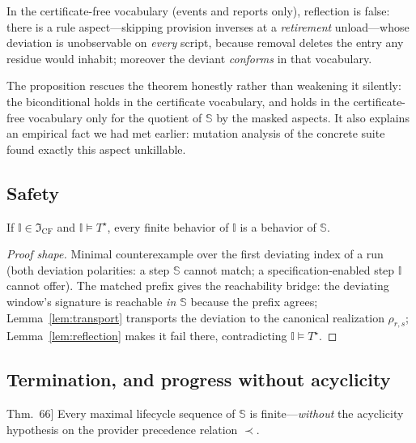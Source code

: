 \documentclass[sigplan,screen,review,nonacm]{acmart}
\newcommand{\Spec}{\ensuremath{\mathbb S}}
\newcommand{\Impl}{\ensuremath{\mathbb I}}
\newcommand{\CF}{\ensuremath{\mathfrak I_{\mathrm{CF}}}}
\newcommand{\Tstar}{\ensuremath{T^{\star}}}
\newcommand{\SZC}{[SZC26]}
\begin{document}
\begin{proposition}[masking]\label{prop:masking}
In the certificate-free vocabulary (events and reports only), reflection is
false: there is a rule aspect---skipping provision inverses at a
\emph{retirement} unload---whose deviation is unobservable on \emph{every}
script, because removal deletes the entry any residue would inhabit; moreover
the deviant \emph{conforms} in that vocabulary.
\end{proposition}

The proposition rescues the theorem honestly rather than weakening it silently:
the biconditional holds in the certificate vocabulary, and holds in the
certificate-free vocabulary only for the quotient of \Spec{} by the masked
aspects. It also explains an empirical fact we had met earlier: mutation
analysis of the concrete suite found exactly this aspect unkillable.

\subsection{Safety}\label{sec:safety}

\begin{theorem}\label{thm:safety}
If $\Impl \in \CF$ and $\Impl \models \Tstar$, every finite behavior of
$\Impl$ is a behavior of \Spec.
\end{theorem}

\begin{proof}[Proof shape]
Minimal counterexample over the first deviating index of a run (both
deviation polarities: a step \Spec{} cannot match; a specification-enabled step
$\Impl$ cannot offer). The matched prefix gives the reachability bridge: the
deviating window's signature is reachable \emph{in \Spec} because the prefix
agrees; Lemma~\ref{lem:transport} transports the deviation to the canonical
realization $\rho_{r,s}$; Lemma~\ref{lem:reflection} makes it fail there,
contradicting $\Impl \models \Tstar$.
\end{proof}

\subsection{Termination, and progress without acyclicity}\label{sec:termination}

\begin{theorem}[generalized progress; strengthens \SZC{} Thm.~66]
\label{thm:progress}
Every maximal lifecycle sequence of \Spec{} is finite---\emph{without} the
acyclicity hypothesis on the provider precedence relation $\prec$.
\end{theorem}
\end{document}
